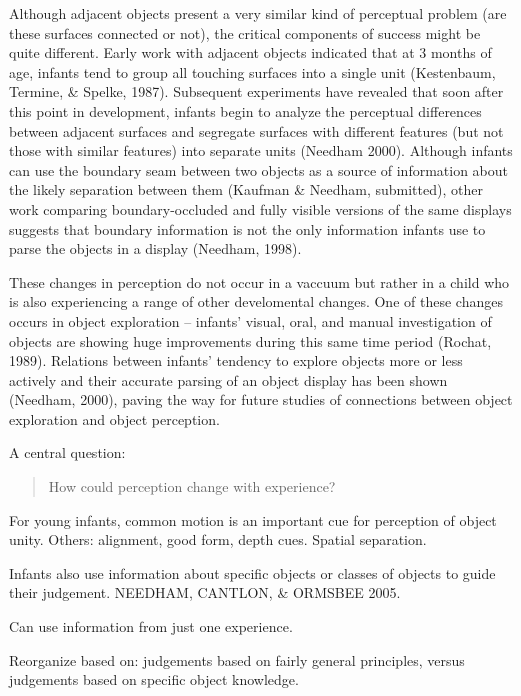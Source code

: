 Although adjacent objects present a very similar kind of perceptual
problem (are these surfaces connected or not), the critical components
of success might be quite different.  Early work with adjacent objects
indicated that at 3 months of age, infants tend to group all touching
surfaces into a single unit (Kestenbaum, Termine, \& Spelke, 1987).
Subsequent experiments have revealed that soon after this point in
development, infants begin to analyze the perceptual differences
between adjacent surfaces and segregate surfaces with different
features (but not those with similar features) into separate units
(Needham 2000).  Although infants can use the boundary seam between
two objects as a source of information about the likely separation
between them (Kaufman \& Needham, submitted), other work comparing
boundary-occluded and fully visible versions of the same displays
suggests that boundary information is not the only information infants
use to parse the objects in a display (Needham, 1998).

These changes in perception do not occur in a vaccuum but rather in a
child who is also experiencing a range of other develomental changes.
One of these changes occurs in object
exploration -- infants' visual, oral, and manual
investigation of objects are showing huge improvements during this
same time period (Rochat, 1989).  Relations between infants'
tendency to explore objects more or less actively and their accurate
parsing of an object display has been shown (Needham, 2000), paving
the way for future studies of connections between object exploration
and object perception.




A central question:

\begin{quote}

How could perception change with experience?

\end{quote}





For young infants, common motion is an important cue for 
perception of object unity.  Others: alignment, good form,
depth cues.  Spatial separation.

Infants also use information about specific objects or
classes of objects to guide their judgement.  
NEEDHAM, CANTLON, \& ORMSBEE 2005.

Can use information from just one experience.

Reorganize based on: judgements based on fairly general
principles, versus judgements based on specific object
knowledge.

